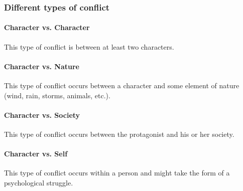 
\subsubsection*{Different types of conflict}

\paragraph{Character vs. Character} This type of conflict is between at least two characters.
\paragraph{Character vs. Nature} This type of conflict occurs between a character and some element of nature (wind, rain, storms, animals, etc.).
\paragraph{Character vs. Society} This type of conflict occurs between the protagonist and his or her society.
\paragraph{Character vs. Self} This type of conflict occurs within a person and might take the form of a psychological struggle.

\newpage
